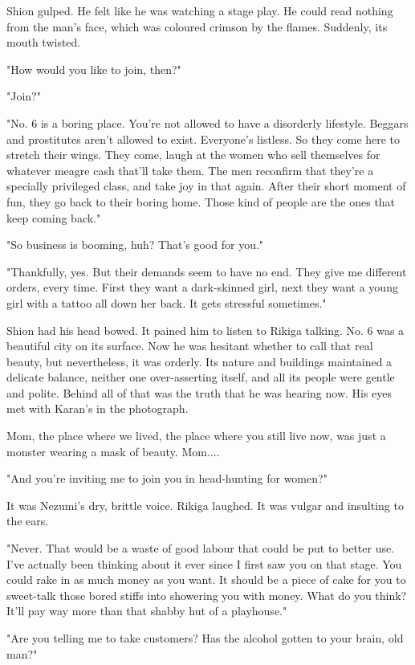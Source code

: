 Shion gulped. He felt like he was watching a stage play. He could read
nothing from the man's face, which was coloured crimson by the flames.
Suddenly, its mouth twisted.

"How would you like to join, then?"

"Join?"

"No. 6 is a boring place. You're not allowed to have a disorderly
lifestyle. Beggars and prostitutes aren't allowed to exist. Everyone's
listless. So they come here to stretch their wings. They come, laugh at
the women who sell themselves for whatever meagre cash that'll take
them. The men reconfirm that they're a specially privileged class, and
take joy in that again. After their short moment of fun, they go back to
their boring home. Those kind of people are the ones that keep coming
back."

"So business is booming, huh? That's good for you."

"Thankfully, yes. But their demands seem to have no end. They give me
different orders, every time. First they want a dark-skinned girl, next
they want a young girl with a tattoo all down her back. It gets
stressful sometimes."

Shion had his head bowed. It pained him to listen to Rikiga talking. No.
6 was a beautiful city on its surface. Now he was hesitant whether to
call that real beauty, but nevertheless, it was orderly. Its nature and
buildings maintained a delicate balance, neither one over-asserting
itself, and all its people were gentle and polite. Behind all of that
was the truth that he was hearing now. His eyes met with Karan's in the
photograph.

Mom, the place where we lived, the place where you still live now, was
just a monster wearing a mask of beauty. Mom....

"And you're inviting me to join you in head-hunting for women?"

It was Nezumi's dry, brittle voice. Rikiga laughed. It was vulgar and
insulting to the ears.

"Never. That would be a waste of good labour that could be put to better
use. I've actually been thinking about it ever since I first saw you on
that stage. You could rake in as much money as you want. It should be a
piece of cake for you to sweet-talk those bored stiffs into showering
you with money. What do you think? It'll pay way more than that shabby
hut of a playhouse."

"Are you telling me to take customers? Has the alcohol gotten to your
brain, old man?"

